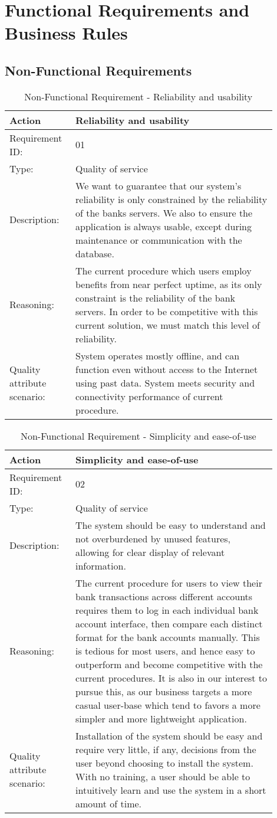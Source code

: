 \documentclass[11pt]{article}
\newcounter{use case ID}
\newcommand\addrow[2]{#1 & #2\\ \hline}
\newcounter{req ID}
\newcommand\tabularheadfsd[1]{
\begin{table}[ht]
    \addtocounter{req ID}{1}
    \caption{Non-Functional Requirement \arabic{req ID} - #1}
    \vspace{0.2cm}
    \begin{tabular}{|p{0.2\linewidth}|p{0.70\linewidth}|}
    \hline
        \textbf{Action} & \textbf{#1} \\
        \hline}
\newenvironment{requirement}{\tabularheadfsd}
{\hline\end{tabular}\end{table}}
\begin{document}
\section{Functional Requirements and Business Rules}
\subsection{Non-Functional Requirements}
\begin{requirement}{Reliability and usability}
    \addrow{Requirement ID:}{01}
    \addrow{Type:}{Quality of service}
    \addrow{Description:}{We want to guarantee that our system's reliability is only constrained by the reliability of the banks servers. We also to ensure the application is always usable, except during maintenance or communication with the database.}
    \addrow{Reasoning:}{The current procedure which users employ benefits from near perfect uptime, as its only constraint is the reliability of the bank servers. In order to be competitive with this current solution, we must match this level of reliability.}
    \addrow{Quality attribute scenario:}{System operates mostly offline, and can function even without access to the Internet using past data. System meets security and connectivity performance of current procedure.}
\end{requirement}

\begin{requirement}{Simplicity and ease-of-use}
    \addrow{Requirement ID:}{02}
    \addrow{Type:}{Quality of service}
    \addrow{Description:}{The system should be easy to understand and not overburdened by unused features, allowing for clear display of relevant information.}
    \addrow{Reasoning:}{The current procedure for users to view their bank transactions across different accounts requires them to log in each individual bank account interface, then compare each distinct format for the bank accounts manually. This is tedious for most users, and hence easy to outperform and become competitive with the current procedures. It is also in our interest to pursue this, as our business targets a more casual user-base which tend to favors a more simpler and more lightweight application.}
    \addrow{Quality attribute scenario:}{Installation of the system should be easy and require very little, if any, decisions from the user beyond choosing to install the system. With no training, a user should be able to intuitively learn and use the system in a short amount of time.}
\end{requirement}
\end{document}
